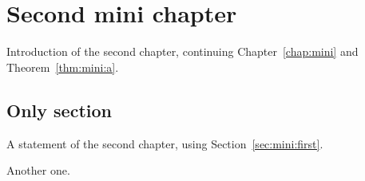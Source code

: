 \chapter{Second mini chapter}\label{chap:mini2}

Introduction of the second chapter, continuing Chapter~\ref{chap:mini} and Theorem~\ref{thm:mini:a}.

\section{Only section}\label{sec:mini2:only}

\begin{lemma}\label{lem:mini2:c}
A statement of the second chapter, using Section~\ref{sec:mini:first}.
\end{lemma}

\begin{remark}\label{rem:mini2:d}
Another one.
\end{remark}
